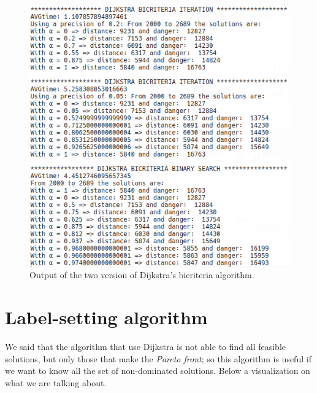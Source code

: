 \documentclass[a4paper,11pt]{report}
\begin{document}
\begin{figure}[h]
	\centering
	\includegraphics[width=\linewidth]{img/biCriteriaOutput.png}
	\caption{Output of the two version of Dijkstra's bicriteria algorithm.}
	\label{fig:dijkstraBiCriteriaSimple}
\end{figure}

\section{Label-setting algorithm}
We said that the algorithm that use Dijkstra is not able to find all feasible solutions, but only those that make the \textit{Pareto front}; so this algorithm is useful if we want to know all the set of non-dominated solutions. Below a visualization on what we are talking about.
\end{document}
